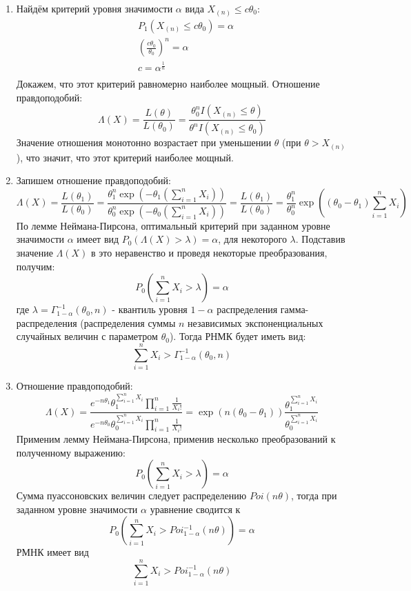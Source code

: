 \documentclass{article}
\begin{document}
\begin{enumerate}
	\item
	      Найдём критерий уровня значимости $\alpha$ вида $X_{(n)} \leq c \theta_0$:
	      \begin{equation*}
		      \begin{aligned}
			       & P_1 \left( X_{(n)} \leq c \theta_0 \right) = \alpha   \\
			       & \left( \frac{c \theta_0}{\theta_0} \right)^n = \alpha \\
			       & c = \alpha^{\frac{1}{n}}                              \\
		      \end{aligned}
	      \end{equation*}
	      Докажем, что этот критерий равномерно наиболее мощный. Отношение правдоподобий:
	      \[
		      \Lambda(X) = \frac{L(\theta)}{L(\theta_0)} = \frac{\theta_0^n I(X_{(n)} \leq \theta)}{\theta^n I(X_{(n)} \leq \theta_0)}
	      \]
	      Значение отношения монотонно возрастает при уменьшении $\theta$ (при $\theta > X_{(n)}$), что значит, что этот критерий наиболее мощный.

	\item
	      Запишем отношение правдоподобий:
	      \[
		      \Lambda(X) = \frac{L(\theta_1)}{L(\theta_0)} = \frac{\theta_1^n \exp(-\theta_1 (\sum_{i=1}^n X_i))}{\theta_0^n \exp(-\theta_0 (\sum_{i=1}^n X_i))} =\frac{L(\theta_1)}{L(\theta_0)} = \frac{\theta_1^n}{\theta_0^n} \exp \left( (\theta_0 - \theta_1) \sum_{i=1}^n X_i \right)
	      \]
	      По лемме Неймана-Пирсона, оптимальный критерий при заданном уровне значимости $\alpha$ имеет вид $P_0(\Lambda(X) > \lambda) = \alpha$, для некоторого $\lambda$. Подставив значение $\Lambda(X)$ в это неравенство и проведя некоторые преобразования, получим:
	      \[
		      P_0 \left( \sum_{i=1}^n X_i > \lambda \right) = \alpha
	      \]
	      где $\lambda = \Gamma^{-1}_{1 - \alpha}(\theta_0, n)$ - квантиль уровня $1 - \alpha$ распределения гамма-распределения (распределения суммы $n$ независимых экспоненциальных случайных величин с параметром $\theta_0$). Тогда РНМК будет иметь вид:
	      \[
		      \sum_{i=1}^n X_i > \Gamma^{-1}_{1 - \alpha}(\theta_0, n)
	      \]

	\item
	      Отношение правдоподобий:
	      \[
		      \Lambda(X) = \frac{e^{-n\theta_1} \theta_1^{\sum_{i=1}^n X_i}\prod_{i=1}^n \frac{1}{X_i!}}{e^{-n\theta_0} \theta_0^{\sum_{i=1}^n X_i}\prod_{i=1}^n \frac{1}{X_i!}} = \exp (n(\theta_0 - \theta_1)) \frac{\theta_1^{\sum_{i=1}^n X_i}}{\theta_0^{\sum_{i=1}^n X_i}}
	      \]
	      Применим лемму Неймана-Пирсона, применив несколько преобразований к полученному выражению:
	      \[
		      P_0 \left( \sum_{i=1}^n X_i > \lambda \right) = \alpha
	      \]
	      Сумма пуассоновских величин следует распределению $Poi(n \theta)$, тогда при заданном уровне значимости $\alpha$ уравнение сводится к
	      \[
		      P_0 \left( \sum_{i=1}^n X_i > Poi^{-1}_{1 - \alpha} (n \theta) \right) = \alpha
	      \]
	      РМНК имеет вид
	      \[
		      \sum_{i=1}^n X_i > Poi^{-1}_{1 - \alpha} (n \theta)
	      \]

\end{enumerate}
\end{document}
